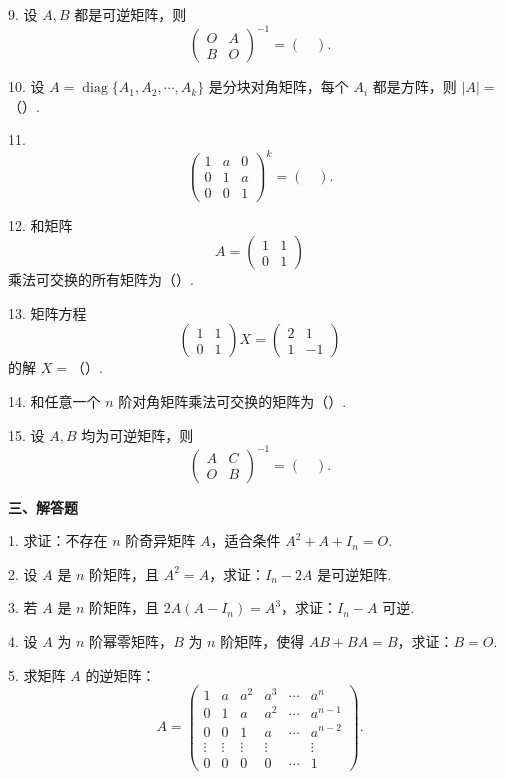 \documentclass[UTF8, 12pt, fontset=fandol, oneside]{ctexart}
\begin{document}
9. 设 $A,B$ 都是可逆矩阵，则
\[
\left(
\begin{array}{cc}
O & A\\
B & O
\end{array}
\right)^{-1}
=\left(\quad\right).
\]

10. 设 $A=\operatorname{diag}\{A_1,A_2,\cdots,A_k\}$ 是分块对角矩阵，每个 $A_i$ 都是方阵，则 $|A|=$（\quad ）.

11.
\[
\left(
\begin{array}{ccc}
1 & a & 0\\
0 & 1 & a\\
0 & 0 & 1
\end{array}
\right)^k
=\left(\quad\right).
\]

12. 和矩阵
\[
A=
\left(
\begin{array}{cc}
1 & 1\\
0 & 1
\end{array}
\right)
\]
乘法可交换的所有矩阵为（\quad ）.

13. 矩阵方程
\[
\left(
\begin{array}{cc}
1 & 1\\
0 & 1
\end{array}
\right)X=
\left(
\begin{array}{rr}
2 & 1\\
1 & -1
\end{array}
\right)
\]
的解 $X=$（\quad ）.

14. 和任意一个 $n$ 阶对角矩阵乘法可交换的矩阵为（\quad ）.

15. 设 $A,B$ 均为可逆矩阵，则
\[
\left(
\begin{array}{cc}
A & C\\
O & B
\end{array}
\right)^{-1}
=\left(\quad\right).
\]

\noindent\textbf{三、解答题}

1. 求证：不存在 $n$ 阶奇异矩阵 $A$，适合条件 $A^2+A+I_n=O$.

2. 设 $A$ 是 $n$ 阶矩阵，且 $A^2=A$，求证：$I_n-2A$ 是可逆矩阵.

3. 若 $A$ 是 $n$ 阶矩阵，且 $2A(A-I_n)=A^3$，求证：$I_n-A$ 可逆.

4. 设 $A$ 为 $n$ 阶幂零矩阵，$B$ 为 $n$ 阶矩阵，使得 $AB+BA=B$，求证：$B=O$.

5. 求矩阵 $A$ 的逆矩阵：
\[
A=
\left(
\begin{array}{cccccc}
1 & a & a^2 & a^3 & \cdots & a^n\\
0 & 1 & a & a^2 & \cdots & a^{n-1}\\
0 & 0 & 1 & a & \cdots & a^{n-2}\\
\vdots & \vdots & \vdots & \vdots & & \vdots\\
0 & 0 & 0 & 0 & \cdots & 1
\end{array}
\right).
\]
\end{document}
